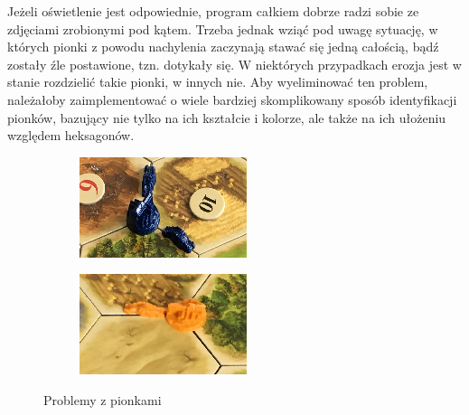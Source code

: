 \documentclass[a4paper]{article}
\begin{document}
    Jeżeli oświetlenie jest odpowiednie, program całkiem dobrze radzi sobie ze zdjęciami zrobionymi pod kątem. Trzeba jednak wziąć pod uwagę sytuację, w których pionki z powodu nachylenia zaczynają stawać się jedną całością, bądź zostały źle postawione, tzn. dotykały się. W niektórych przypadkach erozja jest w stanie rozdzielić takie pionki, w innych nie. Aby wyeliminować ten problem, należałoby zaimplementować o wiele bardziej skomplikowany sposób identyfikacji pionków, bazujący nie tylko na ich kształcie i kolorze, ale także na ich ułożeniu względem heksagonów.
		\begin{figure}[H]
        \begin{subfigure}[]{0.5\linewidth}
        \includegraphics[width=\linewidth]{pictures/fields/angle.png}
        \end{subfigure}
        \begin{subfigure}[]{0.5\linewidth}
        \includegraphics[width=\linewidth]{pictures/fields/touch.png}
        \end{subfigure}

        \caption{Problemy z pionkami}
        \label{fig:problem_pawns}
    \end{figure}
\end{document}
